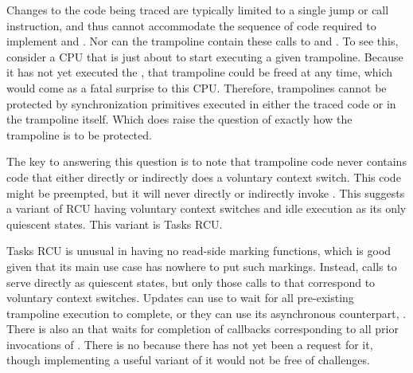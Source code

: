 Changes to the code being traced are typically limited to a single jump
or call instruction, and thus cannot accommodate the sequence of code
required to implement  and .
Nor can the trampoline contain these calls to  and
.
To see this, consider a CPU that is just about to start executing a
given trampoline.
Because it has not yet executed the , that
trampoline could be freed at any time, which would come as a fatal
surprise to this CPU\@.
Therefore, trampolines cannot be protected by synchronization primitives
executed in either the traced code or in the trampoline itself.
Which does raise the question of exactly how the trampoline is to be
protected.

The key to answering this question is to note that trampoline code
never contains code that either directly or indirectly does a
voluntary context switch.
This code might be preempted, but it will never directly or indirectly
invoke .
This suggests a variant of RCU having voluntary context switches and
idle execution as its only quiescent states.
This variant is Tasks RCU\@.

Tasks RCU is unusual in having no read-side marking functions, which
is good given that its main use case has nowhere to put such markings.
Instead, calls to  serve directly as quiescent states,
but only those calls to  that correspond to voluntary
context switches.
Updates can use  to wait for all pre-existing
trampoline execution to complete, or they can use its asynchronous
counterpart, .
There is also an  that waits for completion
of callbacks corresponding to all prior invocations of .
There is no  because there has
not yet been a request for it, though implementing a useful variant of
it would not be free of challenges.

\QuickQuizEnd


